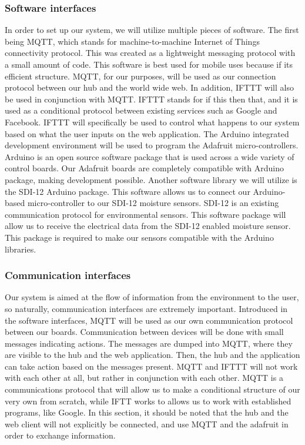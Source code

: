 \documentclass[onecolumn, draftclsnofoot,10pt, compsoc]{IEEEtran}
\begin{document}
        \subsubsection{Software interfaces}
        In order to set up our system, we will utilize multiple pieces of software.      
        The first being MQTT, which stands for machine-to-machine Internet of Things connectivity protocol.
        This was created as a lightweight messaging protocol with a small amount of code.   
        This software is best used for mobile uses because if its efficient structure.       
        MQTT, for our purposes, will be used as our connection protocol between our hub and the world wide web. 
        In addition, IFTTT will also be used in conjunction with MQTT. 
        IFTTT stands for if this then that, and it is used as a conditional protocol between existing services such as Google and Facebook.
        IFTTT will specifically be used to control what happens to our system based on what the user inputs on the web application. 
        The Arduino integrated development environment will be used to program the Adafruit micro-controllers.
        Arduino is an open source software package that is used across a wide variety of control boards.
        Our Adafruit boards are completely compatible with Arduino package, making development possible. 
        Another software library we will utilize is the SDI-12 Arduino package.
        This software allows us to connect our Arduino-based micro-controller to our SDI-12 moisture sensors. 
        SDI-12 is an existing communication protocol for environmental sensors. 
        This software package will allow us to receive the electrical data from the SDI-12 enabled moisture sensor.
        This package is required to make our sensors compatible with the Arduino libraries. 
        
        \subsubsection{Communication interfaces} Our system is aimed at the flow of information from the environment to the user, so naturally, communication interfaces are extremely important.
        Introduced in the software interfaces, MQTT will be used as our own communication protocol between our boards. 
        Communication between devices will be done with small messages indicating actions. 
        The messages are dumped into MQTT, where they are visible to the hub and the web application. 
        Then, the hub and the application can take action based on the messages present. 
        MQTT and IFTTT will not work with each other at all, but rather in conjunction with each other.
        MQTT is a communications protocol that will allow us to make a conditional structure of our very own from scratch, while IFTT works to allows us to work with established programs, like Google. 
       In this section, it should be noted that the hub and the web client will not explicitly be connected, and use MQTT and the adafruit in order to exchange information. 
\end{document}
